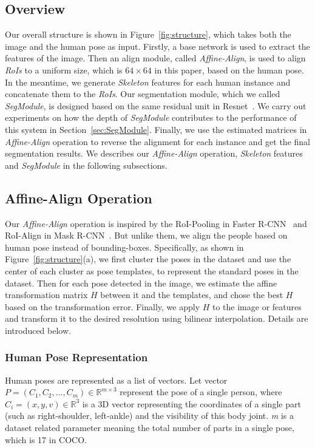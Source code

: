 \documentclass[10pt,twocolumn,letterpaper]{article}
\begin{document}
\subsection{Overview}
\label{sec:overview}
Our overall structure is shown in Figure~\ref{fig:structure}, which takes both the image and the human pose as input. Firstly, a base network is used to extract the features of the image. Then an align module, called \emph{Affine-Align}, is used to align \emph{RoIs} to a uniform size, which is $64\times64$ in this paper, based on the human pose. In the meantime, we generate \emph{Skeleton} features for each human instance and concatenate them to the \emph{RoIs}. Our segmentation module, which we called \emph{SegModule}, is designed based on the same residual unit in Resnet~\cite{he2016deep}. We carry out experiments on how the depth of \emph{SegModule} contributes to the performance of this system in Section~\ref{sec:SegModule}. Finally, we use the estimated matrices in \emph{Affine-Align} operation to reverse the alignment for each instance and get the final segmentation results. We describes our \emph{Affine-Align} operation, \emph{Skeleton} features and \emph{SegModule} in the following subsections.

\subsection{Affine-Align Operation}
\label{sec:AffineAlign}
Our \emph{Affine-Align} operation is inspired by the RoI-Pooling in Faster R-CNN~\cite{ren2015faster} and RoI-Align in Mask R-CNN~\cite{He2017Mask}. But unlike them, we align the people based on human pose instead of bounding-boxes. Specifically, as shown in Figure~\ref{fig:structure}(a), we first cluster the poses in the dataset and use the center of each cluster as pose templates, to represent the standard poses in the dataset. Then for each pose detected in the image, we estimate the affine transformation matrix $H$ between it and the templates, and chose the best $H$ based on the transformation error. Finally, we apply $H$ to the image or features and transform it to the desired resolution using bilinear interpolation. Details are introduced below.

\subsubsection{Human Pose Representation}
Human poses are represented as a list of vectors. Let vector $P = (C_1, C_2, ..., C_m) \in \mathbb{R}^{m \times 3} $  represent the pose of a single person, where $C_i = (x, y, v) \in \mathbb{R}^3 $ is a 3D vector 
representing the coordinates of a single part (such as right-shoulder, left-ankle) and the visibility of this body joint. \emph{m} is a dataset related parameter meaning the total number of parts in a single pose, which is 17 in COCO. 
\end{document}
